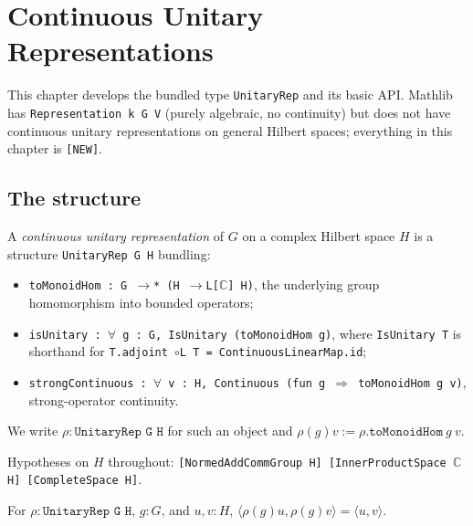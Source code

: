 \chapter{Continuous Unitary Representations}
\label{chap:rep}

This chapter develops the bundled type \texttt{UnitaryRep} and its
basic API.  Mathlib has \texttt{Representation k G V} (purely algebraic,
no continuity) but does not have continuous unitary representations on
general Hilbert spaces; everything in this chapter is \texttt{[NEW]}.

\section{The structure}

\begin{definition}
  \label{def:UnitaryRep}
  \leanok
  A \emph{continuous unitary representation} of $G$ on a complex Hilbert
  space $H$ is a structure
  \texttt{UnitaryRep G H} bundling:
  \begin{itemize}
    \item \texttt{toMonoidHom : G $\to$* (H $\to$L[$\mathbb C$] H)}, the
      underlying group homomorphism into bounded operators;
    \item \texttt{isUnitary : $\forall$ g : G, IsUnitary (toMonoidHom g)},
      where \texttt{IsUnitary T} is shorthand for
      \texttt{T.adjoint $\circ$L T = ContinuousLinearMap.id};
    \item \texttt{strongContinuous :
      $\forall$ v : H, Continuous (fun g $\Rightarrow$ toMonoidHom g v)},
      strong-operator continuity.
  \end{itemize}
  We write $\rho : \texttt{UnitaryRep G H}$ for such an object and
  $\rho(g) v := \rho.\texttt{toMonoidHom}\ g\ v$.

  Hypotheses on $H$ throughout: \texttt{[NormedAddCommGroup H]
  [InnerProductSpace $\mathbb C$ H] [CompleteSpace H]}.
\end{definition}

\begin{theorem}
  \label{thm:rho-inner}
  \leanok
  For $\rho : \texttt{UnitaryRep G H}$, $g : G$, and $u, v : H$,
  $\langle \rho(g) u, \rho(g) v\rangle = \langle u, v\rangle$.
\end{theorem}

